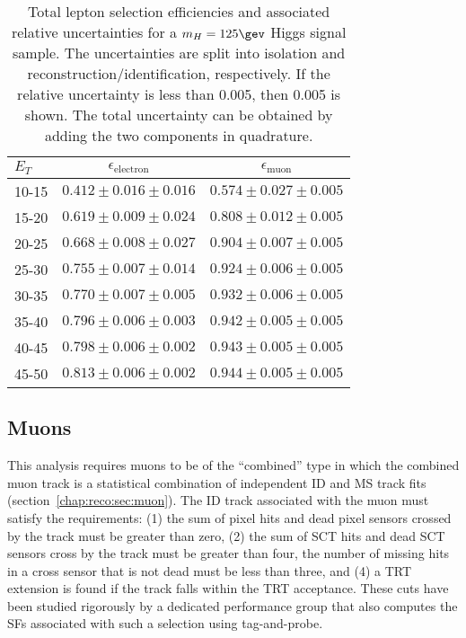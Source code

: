 \begin{table}[h]
\centering
\begin{tabular}{l|c|c}
\hline
$E_{T}$ & $\epsilon_{\textrm{electron}}$ & $\epsilon_{\textrm{muon}}$
\\ \hline
10-15 & $0.412 \pm 0.016 \pm 0.016$ & $0.574 \pm 0.027 \pm 0.005$ \\
15-20 & $0.619 \pm 0.009 \pm 0.024$ & $0.808 \pm 0.012 \pm 0.005$ \\
20-25 & $0.668 \pm 0.008 \pm 0.027$ & $0.904 \pm 0.007 \pm 0.005$ \\
25-30 & $0.755 \pm 0.007 \pm 0.014$ & $0.924 \pm 0.006 \pm 0.005$ \\
30-35 & $0.770 \pm 0.007 \pm 0.005$ & $0.932 \pm 0.006 \pm 0.005$ \\
35-40 & $0.796 \pm 0.006 \pm 0.003$ & $0.942 \pm 0.005 \pm 0.005$ \\
40-45 & $0.798 \pm 0.006 \pm 0.002$ & $0.943 \pm 0.005 \pm 0.005$ \\
45-50 & $0.813 \pm 0.006 \pm 0.002$ & $0.944 \pm 0.005 \pm 0.005$ \\
\hline
\end{tabular}
\caption[Total lepton selection efficiencies and associated
  relative uncertainties.]{Total lepton selection efficiencies and associated
  relative uncertainties for a $m_H= 125 \gev$ Higgs signal
  sample. The uncertainties are split into isolation and
  reconstruction/identification, respectively. If the relative
  uncertainty is less than 0.005, then 0.005 is shown. The total
  uncertainty can be obtained by adding the two
  components in quadrature.}
\label{chap:analysis:tab:lepton_eff}
\end{table}

\subsection{Muons}

This analysis requires muons to be of the ``combined'' type in which
the combined muon track is a statistical combination of independent ID and MS
track fits (section~\ref{chap:reco:sec:muon}). The ID track associated
with the muon must satisfy the requirements: (1) the sum of pixel hits
and dead pixel sensors crossed by the track must be greater than zero,
(2) the sum of SCT hits and dead SCT sensors cross by the track must
be greater than four, the number of missing hits in a cross sensor
that is not dead must be less than three, and (4) a TRT extension is
found if the track falls within the TRT acceptance. These cuts have
been studied rigorously by a dedicated performance group that also
computes the SFs associated with such a selection using
tag-and-probe. 

